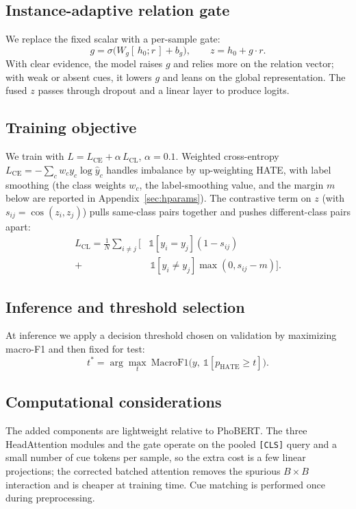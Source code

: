 \documentclass[11pt]{article}
\begin{document}
\subsection{Instance-adaptive relation gate}
We replace the fixed scalar with a per-sample gate:
\begin{equation}
  g = \sigma\big(W_g[\,h_0;r\,] + b_g\big),\qquad z = h_0 + g\cdot r.
\end{equation}
With clear evidence, the model raises $g$ and relies more on the relation vector; with weak or absent cues, it lowers $g$ and leans on the global representation. The fused $z$ passes through dropout and a linear layer to produce logits.

\subsection{Training objective}
We train with $L = L_{\mathrm{CE}} + \alpha\,L_{\mathrm{CL}}$, $\alpha=0.1$. Weighted cross-entropy $L_{\mathrm{CE}}=-\sum_c w_c y_c\log\hat y_c$ handles imbalance by up-weighting HATE, with label smoothing (the class weights $w_c$, the label-smoothing value, and the margin $m$ below are reported in Appendix~\ref{sec:hparams}). The contrastive term on $z$ (with $s_{ij}=\cos(z_i,z_j)$) pulls same-class pairs together and pushes different-class pairs apart:
\begin{equation}
\begin{split}
  L_{\mathrm{CL}} = \frac{1}{N}\sum_{i\neq j}\big[&\mathbb{1}[y_i{=}y_j](1-s_{ij}) \\[-2pt]
   + &\,\mathbb{1}[y_i{\neq}y_j]\max(0, s_{ij}-m)\big].
\end{split}
\end{equation}

\subsection{Inference and threshold selection}
At inference we apply a decision threshold chosen on validation by maximizing macro-F1 and then fixed for test:
\begin{equation}
  t^{*} = \arg\max_t\ \mathrm{MacroF1}\big(y,\ \mathbb{1}[p_{\mathrm{HATE}}\ge t]\big).
\end{equation}

\subsection{Computational considerations}
The added components are lightweight relative to PhoBERT. The three HeadAttention modules and the gate operate on the pooled \texttt{[CLS]} query and a small number of cue tokens per sample, so the extra cost is a few linear projections; the corrected batched attention removes the spurious $B\times B$ interaction and is cheaper at training time. Cue matching is performed once during preprocessing.
\end{document}
